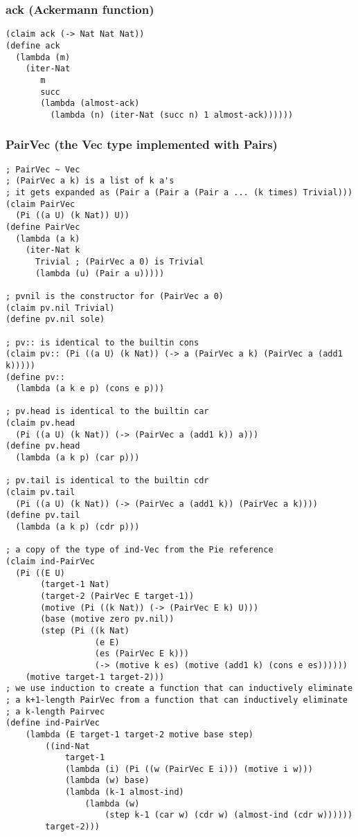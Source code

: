 \subsubsection{ack (Ackermann function)} \label{code:ack}
\begin{verbatim}
(claim ack (-> Nat Nat Nat))
(define ack
  (lambda (m)
    (iter-Nat
       m
       succ
       (lambda (almost-ack)
         (lambda (n) (iter-Nat (succ n) 1 almost-ack))))))
\end{verbatim}


\subsubsection{PairVec (the Vec type implemented with Pairs)} \label{code:PairVec}
\begin{verbatim}
; PairVec ~ Vec
; (PairVec a k) is a list of k a's
; it gets expanded as (Pair a (Pair a (Pair a ... (k times) Trivial)))
(claim PairVec
  (Pi ((a U) (k Nat)) U))
(define PairVec
  (lambda (a k)
    (iter-Nat k
      Trivial ; (PairVec a 0) is Trivial
      (lambda (u) (Pair a u)))))

; pvnil is the constructor for (PairVec a 0)
(claim pv.nil Trivial)
(define pv.nil sole)

; pv:: is identical to the builtin cons
(claim pv:: (Pi ((a U) (k Nat)) (-> a (PairVec a k) (PairVec a (add1 k)))))
(define pv::
  (lambda (a k e p) (cons e p)))

; pv.head is identical to the builtin car
(claim pv.head
  (Pi ((a U) (k Nat)) (-> (PairVec a (add1 k)) a)))
(define pv.head
  (lambda (a k p) (car p)))

; pv.tail is identical to the builtin cdr
(claim pv.tail
  (Pi ((a U) (k Nat)) (-> (PairVec a (add1 k)) (PairVec a k))))
(define pv.tail
  (lambda (a k p) (cdr p)))

; a copy of the type of ind-Vec from the Pie reference
(claim ind-PairVec
  (Pi ((E U)
       (target-1 Nat)
       (target-2 (PairVec E target-1))
       (motive (Pi ((k Nat)) (-> (PairVec E k) U)))
       (base (motive zero pv.nil))
       (step (Pi ((k Nat)
                  (e E)
                  (es (PairVec E k)))
                  (-> (motive k es) (motive (add1 k) (cons e es))))))
    (motive target-1 target-2)))
; we use induction to create a function that can inductively eliminate
; a k+1-length PairVec from a function that can inductively eliminate
; a k-length Pairvec
(define ind-PairVec
    (lambda (E target-1 target-2 motive base step)
        ((ind-Nat
            target-1
            (lambda (i) (Pi ((w (PairVec E i))) (motive i w)))
            (lambda (w) base)
            (lambda (k-1 almost-ind)
                (lambda (w)
                    (step k-1 (car w) (cdr w) (almost-ind (cdr w))))))
        target-2)))
\end{verbatim}



